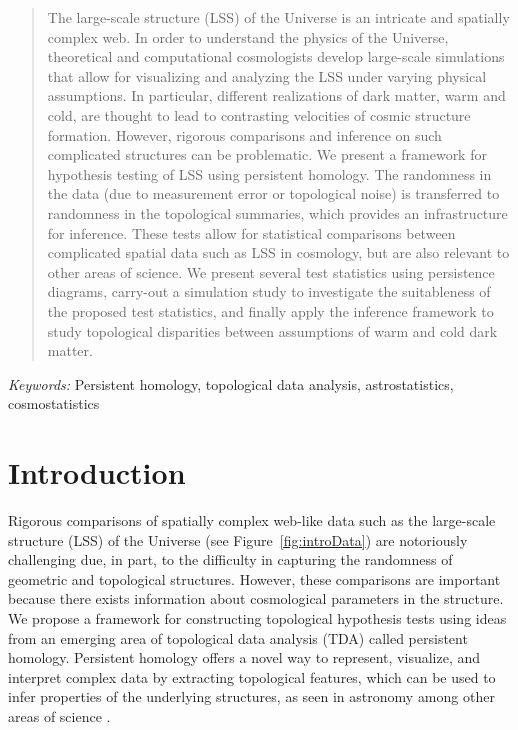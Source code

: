 \documentclass[12pt]{article}
\newcommand{\figref}[1]{Figure~\ref{#1}}
\begin{document}
\bigskip
\begin{abstract}
The large-scale structure (LSS) of the Universe is an intricate and spatially complex web. In order to understand the physics of the Universe, theoretical and computational cosmologists develop large-scale simulations that allow for visualizing and analyzing the LSS under varying physical assumptions. In particular, different realizations of dark matter, warm and cold, are thought to lead to contrasting velocities of cosmic structure formation. However, rigorous comparisons and inference on such complicated structures can be problematic.  We present a framework for hypothesis testing of LSS using persistent homology. The randomness in the data (due to measurement error or topological noise) is transferred to randomness in the topological summaries, which provides an infrastructure for inference. These tests allow for statistical comparisons between complicated spatial data such as LSS in cosmology, but are also relevant to other areas of science. We present several test statistics using persistence diagrams, carry-out a simulation study to investigate the suitableness of the proposed test statistics, and finally apply the inference framework to study topological disparities between assumptions of warm and cold dark matter.
\end{abstract}

\noindent%
{\it Keywords:} Persistent homology, topological data analysis, astrostatistics, cosmostatistics 


\section{Introduction}
\label{sec:intro}

Rigorous comparisons of spatially complex web-like data such as the large-scale structure (LSS) of the Universe (see \figref{fig:introData}) are notoriously challenging due, in part, to the difficulty in capturing the randomness of geometric and topological structures.  However, these comparisons are important because there exists information about cosmological parameters in the structure. We propose a framework for constructing topological hypothesis tests using ideas from an emerging area of topological data analysis (TDA) called persistent homology. Persistent homology offers a novel way to represent, visualize, and interpret complex data by extracting topological features, which can be used to infer properties of the underlying structures, as seen in astronomy \citep{Sousbie2011, SousbieEtAl2011, van2011alpha,cisewski2014non} among other areas of science \citep{bendich2014persistent, duong2012closed}.
\end{document}
